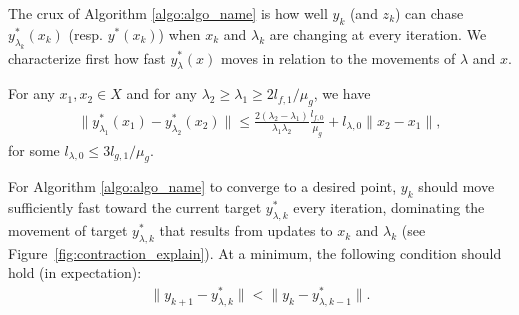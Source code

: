 The crux of Algorithm \ref{algo:algo_name} is how well $y_k$ (and $z_k$) can chase $y_{\lambda_k}^*(x_k)$ (resp. $y^*(x_k)$) when $x_k$ and $\lambda_k$ are changing  at every iteration. 
We characterize first how fast $y_\lambda^*(x)$ moves in relation to the movements of $\lambda$ and $x$.
%
\begin{lemma}
    \label{lemma:y_star_lagrangian_continuity}
    For any $x_1, x_2 \in X$ and for any $\lambda_2 \ge \lambda_1 \ge 2 l_{f,1} / \mu_g$, we have
    \begin{align*}
        \| y_{\lambda_1}^*(x_1) - y_{\lambda_2}^*(x_2)\| \le \frac{ 2(\lambda_2 - \lambda_1)}{\lambda_1\lambda_2} \frac{l_{f,0}}{\mu_g} + l_{\lambda,0} \|x_2 - x_1\|,
    \end{align*}
    for some $l_{\lambda,0} \le 3l_{g,1} / \mu_g$.
\end{lemma}
For Algorithm \ref{algo:algo_name} to converge to a desired point, $y_k$ should move sufficiently fast toward the current target $y_{\lambda,k}^*$ every iteration, dominating the movement of target $y_{\lambda, k}^*$ that results from updates to $x_k$ and $\lambda_k$ (see Figure~\ref{fig:contraction_explain}). 
At a minimum, the following condition should hold (in expectation):
\begin{align*}
    \|y_{k+1} - y_{\lambda, k}^*\| < \| y_k - y_{\lambda, k-1}^* \|.
\end{align*}


